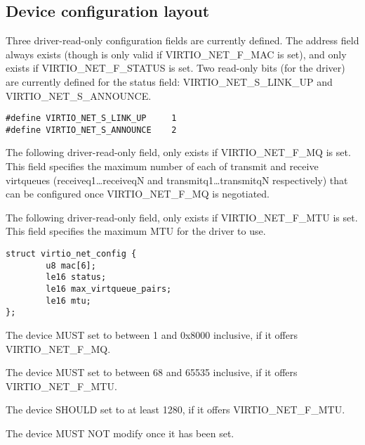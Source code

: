 \subsection{Device configuration layout}\label{sec:Device Types / Network Device / Device configuration layout}
\label{sec:Device Types / Block Device / Feature bits / Device configuration layout}

Three driver-read-only configuration fields are currently defined. The  address field
always exists (though is only valid if VIRTIO_NET_F_MAC is set), and
 only exists if VIRTIO_NET_F_STATUS is set. Two
read-only bits (for the driver) are currently defined for the status field:
VIRTIO_NET_S_LINK_UP and VIRTIO_NET_S_ANNOUNCE.

\begin{lstlisting}
#define VIRTIO_NET_S_LINK_UP     1
#define VIRTIO_NET_S_ANNOUNCE    2
\end{lstlisting}

The following driver-read-only field,  only exists if
VIRTIO_NET_F_MQ is set. This field specifies the maximum number
of each of transmit and receive virtqueues (receiveq1\ldots receiveqN
and transmitq1\ldots transmitqN respectively) that can be configured once VIRTIO_NET_F_MQ
is negotiated.

The following driver-read-only field,  only exists if
VIRTIO_NET_F_MTU is set. This field specifies the maximum MTU for the driver to
use.

\begin{lstlisting}
struct virtio_net_config {
        u8 mac[6];
        le16 status;
        le16 max_virtqueue_pairs;
        le16 mtu;
};
\end{lstlisting}


The device MUST set  to between 1 and 0x8000 inclusive,
if it offers VIRTIO_NET_F_MQ.

The device MUST set  to between 68 and 65535 inclusive,
if it offers VIRTIO_NET_F_MTU.

The device SHOULD set  to at least 1280, if it offers
VIRTIO_NET_F_MTU.

The device MUST NOT modify  once it has been set.

